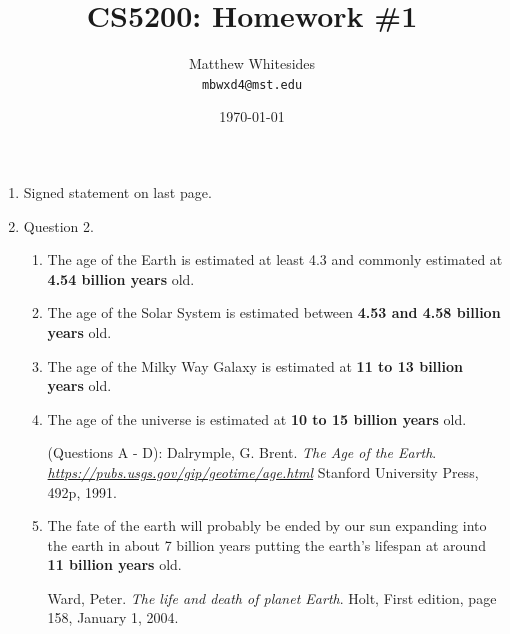 \documentclass{article}
\title{CS5200: Homework \#1} %
\author{Matthew Whitesides\\ \texttt{mbwxd4@mst.edu}} %
\date{\today} %
\begin{document}
\maketitle %
 
\begin{enumerate}
  \item Signed statement on last page. 
  
  \item Question 2.
  \begin{enumerate}
    \item The age of the Earth is estimated at least 4.3 and commonly estimated at \textbf{4.54 billion years} old.

    \item The age of the Solar System is estimated between \textbf{4.53 and 4.58 billion years} old.

    \item The age of the Milky Way Galaxy is estimated at \textbf{11 to 13 billion years} old.

    \item The age of the universe is estimated at \textbf{10 to 15 billion years} old.
    \begin{itemize}
      (Questions A - D): Dalrymple, G. Brent.
      \textit{The Age of the Earth}.
      \textit{\href{https://pubs.usgs.gov/gip/geotime/age.html}{https://pubs.usgs.gov/gip/geotime/age.html}}
      Stanford University Press, 492p, 1991.
    \end{itemize}

    \item The fate of the earth will probably be ended by our sun expanding into the earth in about 7 billion years putting the earth's lifespan at around \textbf{11 billion years} old.
    \begin{itemize}
      Ward, Peter.
      \textit{The life and death of planet Earth}.      
      Holt, First edition, page 158, January 1, 2004.
    \end{itemize}


\end{enumerate}
\end{enumerate}
\end{document}
